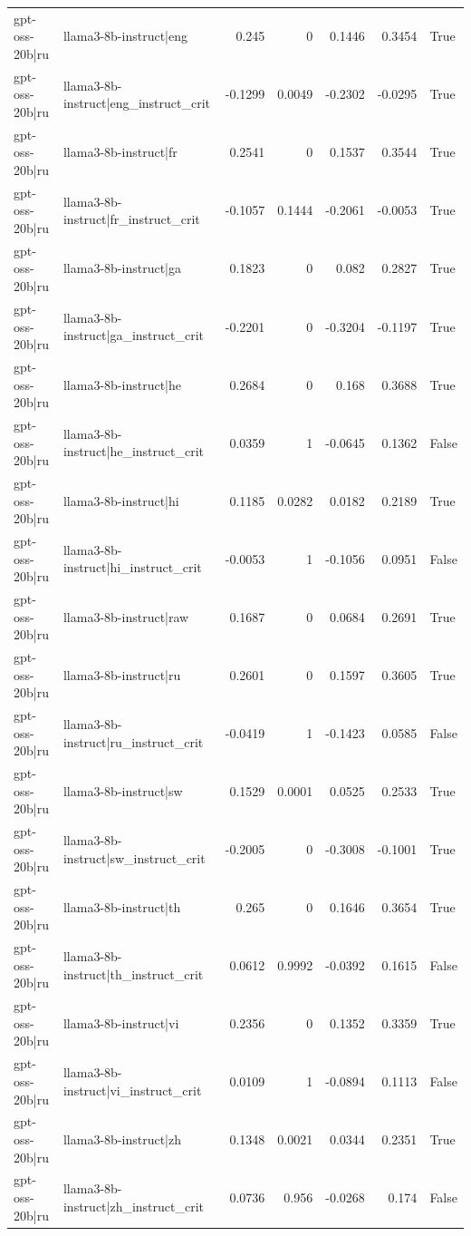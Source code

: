 \begin{table}
\begin{tabular}{l l r r r r l}
gpt-oss-20b|ru & llama3-8b-instruct|eng & 0.245 & 0 & 0.1446 & 0.3454 & True \\
gpt-oss-20b|ru & llama3-8b-instruct|eng_instruct_crit & -0.1299 & 0.0049 & -0.2302 & -0.0295 & True \\
gpt-oss-20b|ru & llama3-8b-instruct|fr & 0.2541 & 0 & 0.1537 & 0.3544 & True \\
gpt-oss-20b|ru & llama3-8b-instruct|fr_instruct_crit & -0.1057 & 0.1444 & -0.2061 & -0.0053 & True \\
gpt-oss-20b|ru & llama3-8b-instruct|ga & 0.1823 & 0 & 0.082 & 0.2827 & True \\
gpt-oss-20b|ru & llama3-8b-instruct|ga_instruct_crit & -0.2201 & 0 & -0.3204 & -0.1197 & True \\
gpt-oss-20b|ru & llama3-8b-instruct|he & 0.2684 & 0 & 0.168 & 0.3688 & True \\
gpt-oss-20b|ru & llama3-8b-instruct|he_instruct_crit & 0.0359 & 1 & -0.0645 & 0.1362 & False \\
gpt-oss-20b|ru & llama3-8b-instruct|hi & 0.1185 & 0.0282 & 0.0182 & 0.2189 & True \\
gpt-oss-20b|ru & llama3-8b-instruct|hi_instruct_crit & -0.0053 & 1 & -0.1056 & 0.0951 & False \\
gpt-oss-20b|ru & llama3-8b-instruct|raw & 0.1687 & 0 & 0.0684 & 0.2691 & True \\
gpt-oss-20b|ru & llama3-8b-instruct|ru & 0.2601 & 0 & 0.1597 & 0.3605 & True \\
gpt-oss-20b|ru & llama3-8b-instruct|ru_instruct_crit & -0.0419 & 1 & -0.1423 & 0.0585 & False \\
gpt-oss-20b|ru & llama3-8b-instruct|sw & 0.1529 & 0.0001 & 0.0525 & 0.2533 & True \\
gpt-oss-20b|ru & llama3-8b-instruct|sw_instruct_crit & -0.2005 & 0 & -0.3008 & -0.1001 & True \\
gpt-oss-20b|ru & llama3-8b-instruct|th & 0.265 & 0 & 0.1646 & 0.3654 & True \\
gpt-oss-20b|ru & llama3-8b-instruct|th_instruct_crit & 0.0612 & 0.9992 & -0.0392 & 0.1615 & False \\
gpt-oss-20b|ru & llama3-8b-instruct|vi & 0.2356 & 0 & 0.1352 & 0.3359 & True \\
gpt-oss-20b|ru & llama3-8b-instruct|vi_instruct_crit & 0.0109 & 1 & -0.0894 & 0.1113 & False \\
gpt-oss-20b|ru & llama3-8b-instruct|zh & 0.1348 & 0.0021 & 0.0344 & 0.2351 & True \\
gpt-oss-20b|ru & llama3-8b-instruct|zh_instruct_crit & 0.0736 & 0.956 & -0.0268 & 0.174 & False \\

\end{tabular}
\end{table}
